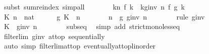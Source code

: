 \begin{isabellebody}
\ {\isacharparenleft}{\kern0pt}subst\ sum{\isachardot}{\kern0pt}reindex{\isacharparenright}{\kern0pt}\ simp{\isacharunderscore}{\kern0pt}all\isanewline
\ \ \ \ \isamarkupfalse%
\ \isamarkupfalse%
\ {\isachardoublequoteopen}{\isacharparenleft}{\kern0pt}{\isasymSum}k{\isacharless}{\kern0pt}n{\isachardot}{\kern0pt}\ f\ k{\isacharparenright}{\kern0pt}\ {\isacharequal}{\kern0pt}\ {\isacharparenleft}{\kern0pt}{\isasymSum}k{\isacharless}{\kern0pt}g{\isacharunderscore}{\kern0pt}inv\ n{\isachardot}{\kern0pt}\ f\ {\isacharparenleft}{\kern0pt}g\ k{\isacharparenright}{\kern0pt}{\isacharparenright}{\kern0pt}{\isachardoublequoteclose}\ \isacommand{{\isachardot}{\kern0pt}}\isamarkupfalse%
\isanewline
\ \ \isamarkupfalse%
\isanewline
\ \ \isamarkupfalse%
\ \isacommand{{\isacharbraceleft}{\kern0pt}}\isamarkupfalse%
\isanewline
\ \ \ \ \isamarkupfalse%
\ K\ n\ {\isacharcolon}{\kern0pt}{\isacharcolon}{\kern0pt}\ nat\isanewline
\ \ \ \ \isamarkupfalse%
\ {\isachardoublequoteopen}g\ K\ {\isasymle}\ n{\isachardoublequoteclose}\isanewline
\ \ \ \ \isamarkupfalse%
\ \isamarkupfalse%
\ {\isachardoublequoteopen}n\ {\isasymle}\ g\ {\isacharparenleft}{\kern0pt}g{\isacharunderscore}{\kern0pt}inv\ n{\isacharparenright}{\kern0pt}{\isachardoublequoteclose}\isanewline
\ \ \ \ \ \ \isamarkupfalse%
\ {\isacharparenleft}{\kern0pt}rule\ g{\isacharunderscore}{\kern0pt}inv{\isacharparenright}{\kern0pt}\isanewline
\ \ \ \ \isamarkupfalse%
\ \isamarkupfalse%
\ {\isachardoublequoteopen}K\ {\isasymle}\ g{\isacharunderscore}{\kern0pt}inv\ n{\isachardoublequoteclose}\isanewline
\ \ \ \ \ \ \isamarkupfalse%
\ subseq\ \isamarkupfalse%
\ {\isacharparenleft}{\kern0pt}simp\ add{\isacharcolon}{\kern0pt}\ strict{\isacharunderscore}{\kern0pt}mono{\isacharunderscore}{\kern0pt}less{\isacharunderscore}{\kern0pt}eq{\isacharparenright}{\kern0pt}\isanewline
\ \ \isacommand{{\isacharbraceright}{\kern0pt}}\isamarkupfalse%
\isanewline
\ \ \isamarkupfalse%
\ \isamarkupfalse%
\ {\isachardoublequoteopen}filterlim\ g{\isacharunderscore}{\kern0pt}inv\ at{\isacharunderscore}{\kern0pt}top\ sequentially{\isachardoublequoteclose}\isanewline
\ \ \ \ \isamarkupfalse%
\ {\isacharparenleft}{\kern0pt}auto\ simp{\isacharcolon}{\kern0pt}\ filterlim{\isacharunderscore}{\kern0pt}at{\isacharunderscore}{\kern0pt}top\ eventually{\isacharunderscore}{\kern0pt}at{\isacharunderscore}{\kern0pt}top{\isacharunderscore}{\kern0pt}linorder{\isacharparenright}{\kern0pt}\isanewline

\end{isabellebody}
